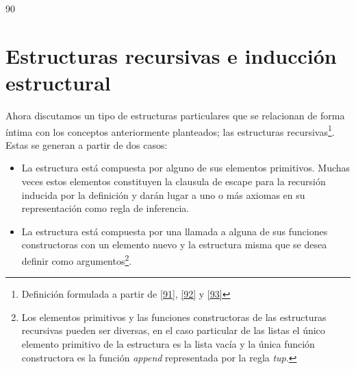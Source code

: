 \begin{exercise}
\begin{turn}{90}
\end{turn}
    \end{exercise}


\section{Estructuras recursivas e inducción estructural}

    Ahora discutamos un tipo de estructuras particulares que se relacionan de forma íntima con los conceptos anteriormente planteados; las estructuras recursivas\footnote{Definición formulada a partir de \hyperlink{91}{[91]}, \hyperlink{92}{[92]} y \hyperlink{93}{[93]}}. Estas se generan a partir de dos casos:
    \begin{itemize}
 
        \item La estructura está compuesta por alguno de sus elementos primitivos. Muchas veces estos elementos constituyen la clausula de escape para la recursión inducida por la definición y darán lugar a uno o más axiomas en su representación como regla de inferencia.
        \item La estructura está compuesta por una llamada a alguna de sus funciones constructoras con un elemento nuevo y la estructura misma que se desea definir como argumentos\footnote{Los elementos primitivos y las funciones constructoras de las estructuras recursivas pueden ser diversas, en el caso particular de las listas el único elemento primitivo de la estructura es la lista vacía y la única función constructora es la función \textit{append} representada por la regla \textit{tup}.}. 
    \end{itemize}


